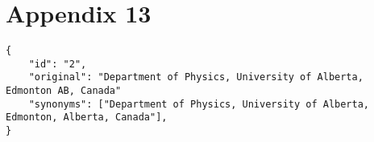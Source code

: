 \section*{Appendix 13}
\label{sec:app13}

\begin{lstlisting}
{
    "id": "2", 
    "original": "Department of Physics, University of Alberta, Edmonton AB, Canada"
    "synonyms": ["Department of Physics, University of Alberta, Edmonton, Alberta, Canada"],
}

\end{lstlisting}
